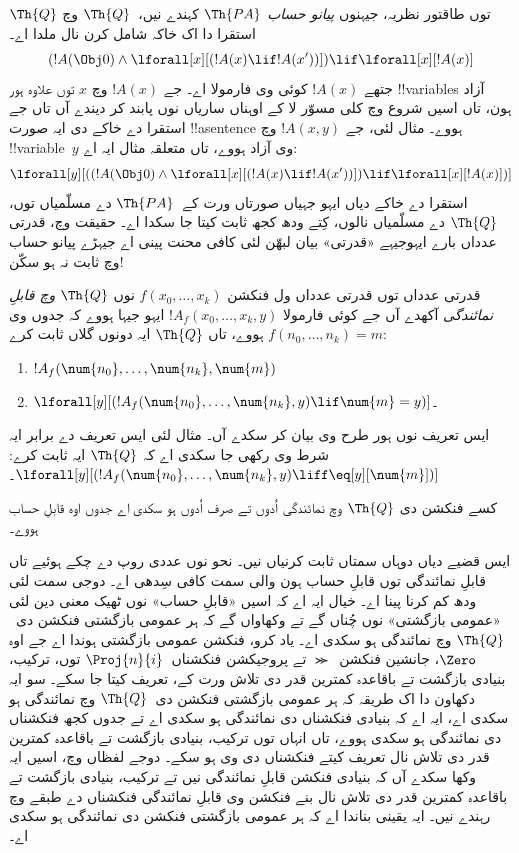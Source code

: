 \documentclass[../../../include/open-logic-section]{subfiles}
\begin{document}
$\Th{Q}$ توں طاقتور نظریہ، جیہنوں \emph{پیانو حساب} $\Th{PA}$
کہندے نیں،~$\Th{Q}$ وچ استقرا دا اک خاکہ شامل کرن نال ملدا اے۔
\[
(!A(\Obj 0) \land \lforall[x][(!A(x) \lif !A(x'))]) \lif \lforall[x][!A(x)]
\]
جتھے $!A(x)$ کوئی وی فارمولا اے۔ جے $!A(x)$ وچ $x$ توں علاوہ ہور !!{variable}s آزاد ہون،
تاں اسیں شروع وچ کلی مسوّر لا کے اوہناں ساریاں نوں پابند کر
دیندے آں تاں جے استقرا دے خاکے دی ایہ صورت !!a{sentence} ہووے۔
مثال لئی، جے $!A(x, y)$ وچ !!{variable}~$y$ وی آزاد
ہووے، تاں متعلقہ مثال ایہ اے:
\[
\lforall[y][((!A(\Obj 0) \land \lforall[x][(!A(x) \lif !A(x'))]) \lif
  \lforall[x][!A(x)])]
\]
استقرا دے خاکے دیاں ایہو جہیاں صورتاں ورت کے~$\Th{PA}$ دے
مسلّمیاں توں، $\Th{Q}$ دے مسلّمیاں نالوں، کِتے ودھ کجھ ثابت
کیتا جا سکدا اے۔ حقیقت وچ، قدرتی عدداں بارے
ایہوجیہے «قدرتی» بیان لبھّن لئی کافی محنت پینی اے
جیہڑے پیانو حساب وچ ثابت نہ ہو سکّن!{}

\begin{defn}
  قدرتی عدداں توں قدرتی عدداں ول فنکشن $f(x_0,\ldots,x_k)$ نوں
{\em $\Th{Q}$ وچ قابلِ نمائندگی} آکھدے آں جے کوئی فارمولا
$!A_f(x_0,\dots,x_k,y)$ ایہو جیہا ہووے کہ جدوں وی
$f(n_0,\dots,n_k) = m$ ہووے، تاں $\Th{Q}$ ایہ دونوں گلاں ثابت کرے:
\begin{enumerate}
\item{} $!A_f(\num{n_0}, \dots, \num{n_k}, \num{m})$
\item{} $\lforall[y][(!A_f(\num{n_0}, \dots,
\num{n_k}, y) \lif \num{m} = y)]$۔
\end{enumerate}
\end{defn}

ایس تعریف نوں ہور طرح وی بیان کر سکدے آں۔ مثال لئی ایس
تعریف دے برابر ایہ شرط وی رکھی جا سکدی اے کہ $\Th{Q}$ ایہ ثابت کرے: $\lforall[y][(!A_f(\num{n_0}, \dots,
\num{n_k}, y) \liff \eq[y][\num{m}])]$۔

\begin{thm}
کسے فنکشن دی $\Th{Q}$ وچ نمائندگی اُدوں تے صرف اُدوں ہو سکدی اے
جدوں اوہ قابلِ حساب ہووے۔
\end{thm}

ایس قضیے دیاں دوہاں سمتاں ثابت کرنیاں نیں۔ نحو نوں عددی روپ
دے چکے ہوئیے تاں قابلِ نمائندگی توں قابلِ حساب ہون والی سمت
کافی سِدھی اے۔ دوجی سمت لئی ودھ کم کرنا پینا اے۔ خیال ایہ اے کہ اسیں «قابلِ حساب» نوں
ٹھیک معنی دین لئی «عمومی بازگشتی» نوں چُناں گے تے وکھاواں گے کہ ہر عمومی بازگشتی فنکشن دی~$\Th{Q}$ وچ
نمائندگی ہو سکدی اے۔ یاد کرو، فنکشن عمومی بازگشتی
ہوندا اے جے اوہ $\Zero$، جانشین فنکشن~$\Succ$ تے
پروجیکشن فنکشناں~$\Proj{n}{i}$ توں، ترکیب، بنیادی
بازگشت تے باقاعدہ کمترین قدر دی تلاش ورت کے، تعریف کیتا جا سکے۔
سو ایہ دکھاون دا اک طریقہ کہ ہر عمومی بازگشتی
فنکشن دی~$\Th{Q}$ وچ نمائندگی ہو سکدی اے، ایہ اے
کہ بنیادی فنکشناں دی نمائندگی ہو سکدی اے تے جدوں
کجھ فنکشناں دی نمائندگی ہو سکدی ہووے، تاں انہاں
توں ترکیب، بنیادی بازگشت تے باقاعدہ کمترین قدر دی تلاش نال
تعریف کیتے فنکشناں دی وی ہو سکے۔ دوجے لفظاں وچ، اسیں ایہ وکھا سکدے آں کہ بنیادی فنکشن قابلِ
نمائندگی نیں تے ترکیب، بنیادی بازگشت تے باقاعدہ کمترین قدر
دی تلاش نال بنے فنکشن وی قابلِ نمائندگی فنکشناں دے طبقے
وچ رہندے نیں۔ ایہ یقینی بناندا اے کہ ہر عمومی بازگشتی
فنکشن دی نمائندگی ہو سکدی اے۔
\end{document}
